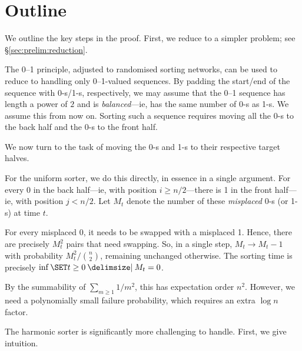 \documentclass{article}
\begin{document}
\section{Outline}
\label{sec:outline}

We outline the key steps in the proof.
First, we reduce to a simpler problem; see \S\ref{sec:prelim:reduction}.

\begin{Proof}[Reduction]
\qedtriangle
The 0--1 principle, adjusted to randomised sorting networks, can be used to reduce to handling only 0--1-valued sequences.
By padding the start/end of the sequence with 0-s/1-s, respectively, we may assume that the 0--1 sequence has length a power of $2$ and is \textit{balanced}---ie, has the same number of 0-s as 1-s.
We assume this from now on.
Sorting such a sequence requires moving all the 0-s to the back half and the 0-s to the front half.
\end{Proof}

We now turn to the task of moving the 0-s and 1-s to their respective target halves.

\begin{Proof}
\qedtriangle
For the uniform sorter, we do this directly, in essence in a single argument.
For every 0 in the back half---ie, with position $i \ge n/2$---there is 1 in the front half---ie, with position $j < n/2$.
Let $M_t$ denote the number of these \textit{misplaced} 0-s (or 1-s) at time $t$.

For every misplaced 0, it needs to be swapped with a misplaced 1.
Hence, there are precisely $M_t^2$ pairs that need swapping.
So, in a single step, $M_t \to M_t - 1$ with probability $M_t^2 / \binom n2$, remaining unchanged otherwise.
The sorting time is precisely $\inf\set{ t \ge 0 \given M_t = 0 }$.

By the summability of $\sum_{m\ge1} 1/m^2$, this has expectation order $n^2$.
However, we need a polynomially small failure probability, which requires an extra $\log n$ factor.
\end{Proof}

The harmonic sorter is significantly more challenging to handle.
First, we give intuition.
\end{document}
